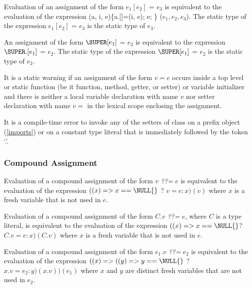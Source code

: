 \documentclass{article}
\newcommand{\code}[1]{{\sf #1}}
\begin{document}
\LMHash{}
Evaluation of an assignment of the form $e_1[e_2]$ \code{=} $e_3$ is equivalent to the evaluation of the expression \code{(a, i, e)\{a.[]=(i, e); \RETURN{} e; \} ($e_1, e_2, e_3$)}.  The static type of the expression $e_1[e_2]$ \code{=} $e_3$ is the static type of $e_3$.

\LMHash{}
An assignment of the form $\SUPER[e_1]$ \code{=} $e_2$ is equivalent to the expression $\SUPER.[e_1]$ \code{=} $e_2$.  The static type of the expression $\SUPER[e_1]$ \code{=} $e_2$ is the static type of $e_2$.



\LMHash{}
It is a static warning if an assignment of the form $v = e$ occurs inside a top level or static function (be it function, method, getter, or setter) or variable initializer and there is neither a local variable declaration with name $v$  nor setter declaration with name $v=$ in the lexical scope enclosing the assignment.

\LMHash{}
It is a compile-time error to invoke any of the setters of class  on a prefix object (\ref{imports}) or on a constant type literal that is  immediately followed by the token `.'.



\subsubsection{Compound Assignment}

\LMHash{}
Evaluation of a compound assignment of the form $v$ {\em ??=} $e$ is equivalent to the evaluation of the expression  $((x) => x == \NULL{}$ ?  $v=e : x)(v)$ where $x$ is a fresh variable that is not used in $e$. 

\LMHash{}
Evaluation of a compound assignment of the form $C.v$ {\em ??=} $e$, where $C$ is a type literal, is equivalent to the evaluation of the expression  $((x) => x == \NULL{}$?  $C.v=e: x)(C.v)$ where $x$ is a fresh variable that is not used in $e$. 


\LMHash{}
Evaluation of a compound assignment of the form $e_1.v$ {\em ??=} $e_2$ is equivalent to the evaluation of the expression  $((x) =>((y) => y == \NULL{}$ ? $ x.v = e_2: y)(x.v))(e_1)$ where $x$ and $y$ are distinct fresh variables that are not used in $e_2$. 
\end{document}
